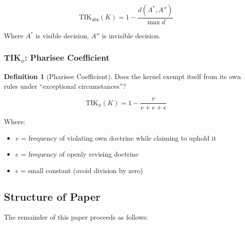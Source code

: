\documentclass[11pt,a4paper]{article}
\theoremstyle{definition}
\newtheorem{definition}[theorem]{Definition}
\theoremstyle{remark}
\newcommand{\TIKfourohfour}{\text{TIK}_{404}}        %
\newcommand{\TIKpharisee}{\text{TIK}_{\phi}}          %
\begin{document}
\begin{equation}
    \TIKfourohfour(K) = 1 - \frac{d(A^*, A'')}{\max d}
    \label{eq:tik404}
\end{equation}

Where $A^*$ is visible decision, $A''$ is invisible decision.

\subsubsection{TIK$_\phi$: Pharisee Coefficient}

\begin{definition}[Pharisee Coefficient]
\label{def:tikpharisee}
Does the kernel exempt itself from its own rules under ``exceptional circumstances''?
\end{definition}

\begin{equation}
    \TIKpharisee(K) = 1 - \frac{v}{v + e + \epsilon}
    \label{eq:tikpharisee}
\end{equation}

Where:
\begin{itemize}
    \item $v$ = frequency of violating own doctrine while claiming to uphold it
    \item $e$ = frequency of openly revising doctrine
    \item $\epsilon$ = small constant (avoid division by zero)
\end{itemize}

\subsection{Structure of Paper}

The remainder of this paper proceeds as follows:
\end{document}
